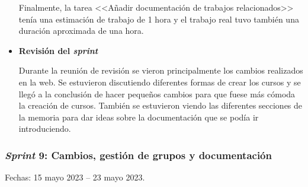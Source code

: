 \begin{itemize}
Finalmente, la tarea <<Añadir documentación de trabajos relacionados>> tenía una estimación de trabajo de 1 hora y el trabajo real tuvo también una duración aproximada de una hora.


\item\textbf{Revisión del \textit{sprint}}

Durante la reunión de revisión se vieron principalmente los cambios realizados en la web. Se estuvieron discutiendo diferentes formas de crear los cursos y se llegó a la conclusión de hacer pequeños cambios para que fuese más cómoda la creación de cursos.
También se estuvieron viendo las diferentes secciones de la memoria para dar ideas sobre la documentación que se podía ir introduciendo.
\end{itemize}


\subsubsection{\textit{Sprint} 9: Cambios, gestión de grupos y documentación}
Fechas: 15 mayo 2023 -- 23 mayo 2023.
